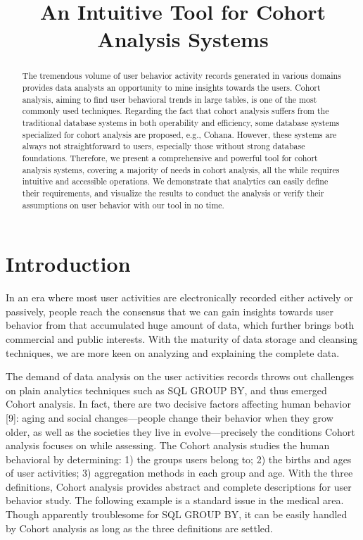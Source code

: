 \documentclass[10pt,conference,letterpaper]{IEEEtran}
\title{An Intuitive Tool for Cohort Analysis Systems}
\begin{document}
\maketitle
%
\begin{abstract} 
The tremendous volume of user behavior activity records generated in various domains provides data analysts an opportunity to mine insights towards the users. Cohort analysis, aiming to find user behavioral trends in large tables, is one of the most commonly used techniques. Regarding the fact that cohort analysis suffers from the traditional database systems in both operability and efficiency, some database systems specialized for cohort analysis are proposed, e.g., Cohana\cite{jiang2016cohort}. However, these systems are always not straightforward to users, especially those without strong database foundations. Therefore, we present a comprehensive and powerful tool for cohort analysis systems, covering a majority of needs in cohort analysis, all the while requires intuitive and accessible operations. We demonstrate that analytics can easily define their requirements, and visualize the results to conduct the analysis or verify their assumptions on user behavior with our tool in no time.
\end{abstract}

%
\section{Introduction}
%
In an era where most user activities are electronically recorded either actively or passively, people reach the consensus that we can gain insights towards user behavior from that accumulated huge amount of data, which further brings both commercial and public interests. With the maturity of data storage and cleansing techniques, we are more keen on analyzing and explaining the complete data.

The demand of data analysis on the user activities records throws out challenges on plain analytics techniques such as SQL GROUP BY, and thus emerged Cohort analysis. In fact, there are two decisive factors affecting human behavior [9]: aging and social changes---people change their behavior when they grow older, as well as the societies they live in evolve---precisely the conditions Cohort analysis focuses on while assessing. The Cohort analysis studies the human behavioral by determining: 1) the groups users belong to; 2) the births and ages of user activities; 3) aggregation methods in each group and age. With the three definitions, Cohort analysis provides abstract and complete descriptions for user behavior study. The following example is a standard issue in the medical area. Though apparently troublesome for SQL GROUP BY, it can be easily handled by Cohort analysis as long as the three definitions are settled.
\end{document}
